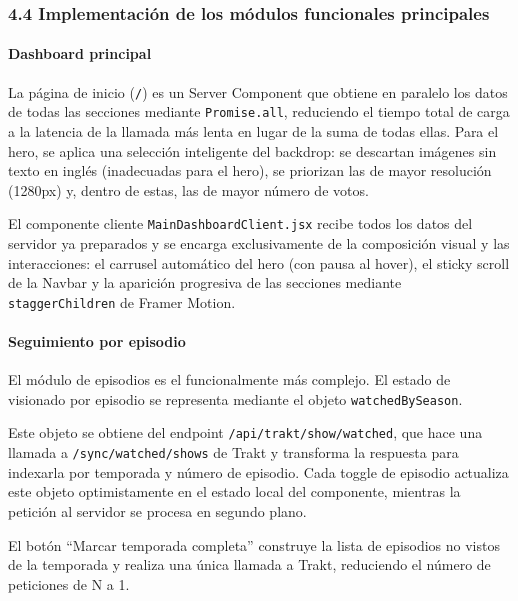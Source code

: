 \documentclass[
]{article}
\begin{document}
\hypertarget{implementaciuxf3n-de-los-muxf3dulos-funcionales-principales}{%
\subsubsection{4.4 Implementación de los módulos funcionales
principales}\label{implementaciuxf3n-de-los-muxf3dulos-funcionales-principales}}

\hypertarget{dashboard-principal}{%
\paragraph{Dashboard principal}\label{dashboard-principal}}

La página de inicio (\texttt{/}) es un Server Component que obtiene en
paralelo los datos de todas las secciones mediante \texttt{Promise.all},
reduciendo el tiempo total de carga a la latencia de la llamada más
lenta en lugar de la suma de todas ellas. Para el hero, se aplica una
selección inteligente del backdrop: se descartan imágenes sin texto en
inglés (inadecuadas para el hero), se priorizan las de mayor resolución
(1280px) y, dentro de estas, las de mayor número de votos.

El componente cliente \texttt{MainDashboardClient.jsx} recibe todos los
datos del servidor ya preparados y se encarga exclusivamente de la
composición visual y las interacciones: el carrusel automático del hero
(con pausa al hover), el sticky scroll de la Navbar y la aparición
progresiva de las secciones mediante \texttt{staggerChildren} de Framer
Motion.

\hypertarget{seguimiento-por-episodio}{%
\paragraph{Seguimiento por episodio}\label{seguimiento-por-episodio}}

El módulo de episodios es el funcionalmente más complejo. El estado de
visionado por episodio se representa mediante el objeto
\texttt{watchedBySeason}.

Este objeto se obtiene del endpoint \texttt{/api/trakt/show/watched},
que hace una llamada a \texttt{/sync/watched/shows} de Trakt y
transforma la respuesta para indexarla por temporada y número de
episodio. Cada toggle de episodio actualiza este objeto optimistamente
en el estado local del componente, mientras la petición al servidor se
procesa en segundo plano.

El botón ``Marcar temporada completa'' construye la lista de episodios
no vistos de la temporada y realiza una única llamada a Trakt,
reduciendo el número de peticiones de N a 1.
\end{document}
